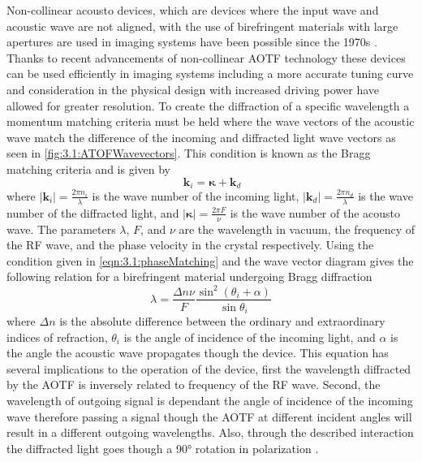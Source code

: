 \documentclass[12pt]{article}
\begin{document}
Non-collinear acousto devices, which are devices where the input wave and acoustic wave are not aligned, with the use of birefringent materials with large apertures are used in 
imaging systems have been possible since the 1970s \citep{Chang1974}. Thanks to recent advancements of non-collinear AOTF technology these devices can be used efficiently in 
imaging systems including a more accurate tuning curve \citep{Georgiev2002} and consideration in the physical design with increased driving power \citep{Voloshinov2007} have 
allowed for greater resolution.  To create the diffraction of a specific wavelength a momentum matching criteria must be held where the wave vectors of the acoustic wave match 
the difference of the incoming and diffracted light wave vectors as seen in \autoref{fig:3.1:ATOFWavevectors}. This condition is known as the Bragg matching criteria and is 
given by
\begin{equation}
    \ \mathbf{k}_{i} = \boldsymbol\kappa + \mathbf{k}_{d}
    \label{eqn:3.1:phaseMatching}
\end{equation}
where $\left|\mathbf{k}_{i}\right| = \frac{2\pi n_{i}}{\lambda}$ is the wave number of the incoming light, $\left|\mathbf{k}_{d}\right| = \frac{2\pi n_{d}}{\lambda}$ is the wave 
number of the diffracted light, and $\left|\boldsymbol\kappa\right| = \frac{2\pi F}{\nu}$ is the wave number of the acousto wave. The parameters $\lambda$, $F$, and $\nu$ are 
the wavelength in vacuum, the frequency of the RF wave, and the phase velocity in the crystal respectively. Using the condition given in \autoref{eqn:3.1:phaseMatching} and the 
wave vector diagram gives the following relation for a birefringent material undergoing Bragg diffraction
\begin{equation}
    \lambda  = \frac{\Delta n\nu}{F}\frac{\sin^{2}(\theta_{i}+\alpha)}{\sin\theta_{i}}
    \label{eqn:3.1:AOTFWavelengthDependance}
\end{equation}
where $\Delta n$ is the absolute difference between the ordinary and extraordinary indices of refraction, $\theta_{i}$ is the angle of incidence of the incoming light, and 
$\alpha$ is the angle the acoustic wave propagates though the device. This equation has several implications to the operation of the device, first the wavelength diffracted by 
the AOTF is inversely related to frequency of the RF wave. Second, the wavelength of outgoing signal is dependant the angle of incidence of the incoming wave therefore passing a 
signal though the AOTF at different incident angles will result in a different outgoing wavelengths. Also, through the described interaction the diffracted light goes though a 
90\si{\degree} rotation in polarization \citep{Voloshinov1996}.
\end{document}
